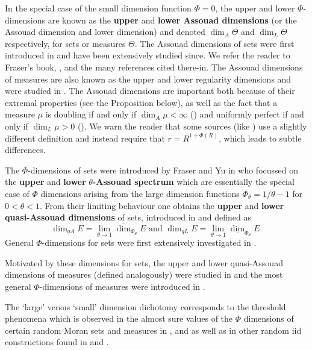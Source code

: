 \documentclass{amsart}
\theoremstyle{plain}
\numberwithin{equation}{section}
\newcommand{\odim}{\overline{\dim}}
\newcommand{\udim}{\underline{\dim}}
\begin{document}
In the special case of the small dimension function $\Phi =0$, the upper and lower $\Phi$-dimensions are known as the \textbf{upper} and 
\textbf{lower Assouad dimensions} (or the Assouad dimension and lower dimension) and
denoted $\dim_{A}\Theta $ and $\dim_{L}\Theta $ respectively, for sets or measures $\Theta$. 
The Assouad dimensions of sets were first introduced in \cite{A2} and have been extensively studied since. 
We refer the reader to Fraser's book, \cite{Fraserbook}, and the many references cited there-in. 
The Assouad dimensions of measures are also known as the upper and lower regularity dimensions and were studied in \cite{FH,KL, KLV}. 
The Assouad dimensions are important both because of their extremal properties (see the Proposition below), as well as the fact that a measure $\mu$ is doubling if and only if $\dim_{A}\mu <\infty$ (\cite{FH}) and uniformly perfect if and only if $\dim_{L}\mu >0$ (\cite{KL}).
We warn the reader that some sources (like \cite{BRT23}) use a slightly different definition and instead require that $r = R^{1+\Phi(R)}$, which
leads to subtle differences.


The $\Phi$-dimensions of sets were introduced by Fraser and Yu in \cite{FY} who focussed on the \textbf{upper} and 
\textbf{lower} $\theta$\textbf{-Assouad spectrum} which are essentially the special case of $\Phi$
dimensions arising from the large dimension functions $\Phi_{\theta}=1/\theta -1$ for $0<\theta <1$. 
From their limiting behaviour one obtains the \textbf{upper} and \textbf{lower quasi-Assouad dimensions} of sets,
introduced in \cite{LX} and defined as
\begin{equation*}
   \dim_{qA}E=\lim_{\theta \rightarrow 1}\odim_{\Phi_{\theta}}E 
        \text{ and }
   \dim_{qL}E=\lim_{\theta \rightarrow 1}\udim_{\Phi_{\theta}}E.
\end{equation*}
General $\Phi$-dimensions for sets were first extensively investigated in \cite{GHM}.

Motivated by these dimensions for sets, the upper and lower quasi-Assouad dimensions of measures (defined analogously) were studied in \cite{HHT, HT} and the most general $\Phi$-dimensions of measures were introduced in \cite{HH}.

The `large' versus `small' dimension dichotomy corresponds to the threshold phenomena which is observed in the almost sure values of the $\Phi$ dimensions of certain random Moran sets and measures in \cite{HM2}, and as well as in other random iid constructions found in \cite{GHM2} and \cite{Tr2}.
\end{document}
